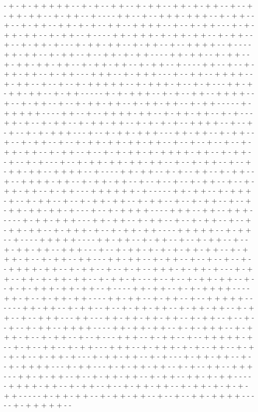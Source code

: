 - + - + - + + + + + - - + - + - - + + - - + - + + - - + + - + - + + - - + - - + - + + - + + - - + - + + - - + - - - - + + - - + - - + + + - + + + - - + - + + - - + - - + - + + - - + + - + - + - - + + - - + + + + - - + - - + - + + - - - + - + - + + - + + - - + - + + - - + - - - - + + - + + + - + - + + - + + - - + - + + - - + - - + - + + - + - - - + - + + - + + - - + - + + - - + - - + + + + - - + - - - - + + - + + - - + - + + - - + - - + + - + - + + - - - - + + - + + - - + - + + - - + - + + - + + - + + - - + - + + - + + - - + - + + - - + - - - - + + - - + - - + - + + - + + - - + - + + - - - + + + - - + - + + + - - - + - - + + - - + + + + - - + - + + - - + - - + - - + - + + + + + - - + - + + + - + - - + - + - - - + + - + - + + - + + - - + - + + - - - - - + - + - + + + - - + - + - - + + - - + + + + - - + - - + - + + - - + - - + - + + - + + - - + - + + - + + - - + - + + - - - - - + - + + + + + - - - - + + - - + - - + + + + - + + - - + - + + - + + - - + - + - - - + + - + - - + - + + - - + - + + - + + - - + - + - + - + - - + + + + - - + - - + - + - - + - + - + + + - - - + - - + - + + - + + + - - - + + - + + - - + - + + - - + - - + - + + - - + - - + - + + - + + - + + - + + - - + - - + - - + - - + - - + - + + - + + - - + - + + - - + - - + - + - + + - + - + + + + - + + - - + - + + - - + - - + - + - - - + - - + - + + - + + - + + - + + - - + - - + - + + - - + - - + - + + - + + - - + + + + - - + - - - - + + - + + - - + - + - - + + - - + - + + - - + - - + + + + - + + - - + - + + - + + - - + - - + - - + - - + - + + - - + - - + - + + - + + - - + - + + - - - + + + + + + - + - - - - - + + - + + - - + - + + + - + - - + - + + - - + - - + - + + - + + - - + - + + - - + - - + - + + - - + - - + - + + - + + - + + - + - - - + - - + - + + + + - - - - + + + - - + + - - + + + - - - - - + - + + - + + + - - - + + - + + - - + - + + - - + - - + - + + - - + - - + - + + - + + - - + - + + + - + - - + - + + - + + - - - - + + + + + - - + - + + - - + - - - - + + + + + - - - - + + - + + - - + - + + - - + - - + - + + - - + - - + - + + - + + - - + + + - - - + - - + - + + - + - + - + - + + - + + - - + - + + + - + - - + - + + - - + + - - - + + - + + - - + - + + - - + - - + - - + - - + - - + + + + - + + - - + - + + - - + - - + - + - - + + + - + - + + - + - - - + - + + - - + + - + - + + - + + - - + - + + - + - - - + - - + - - + - + + - + + - - + - - + - + - + + + - + + - + + - - + - - - - + + - + + - - + - + - + + + + - - - - + + - + - - + - + + - + + - - - - + + - + + - - + - + + - - + - - + + + + + - - - - - - + + - + + - - + - + + - - + - - + - + + - + + - - + - + + - + + - - + - + + - - + - - + + + - - - + + - - - + + - + + - + + - + + - - + - + + - - + - - + - - + - - + - + + - - + + + + - - - - + + - + + - + + - - + - + - + + + - - + - + + + - + - - + - + + - - + - - + - - - + + + - - + - + + - - + - - + + + + + - + - - + - + - - + + - - + - + + - - - + + + - - + - + + + - + - + - - + + - - + - + - + - + - - + - + + - + - - - + - + + - + + - - + - + - - - + - + + - + + - - + - - + - + + + + - - - + - + + - - - + - + - + + - + + - - + - + - - + + - - + + + - - - + + - + - + + - - + - - + - + + - + + - - + - + + - - + + - + - + + - - - - - + + + + - + + - - + - + + - - + - - + - + + - + + - - + - + + - + - + - + - + + - - - - - + - + + - + + - - + - + + - + + - - + - - + - - + + - + + + + - - - - - + - + + + + + - - 